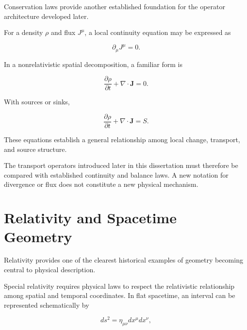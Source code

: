 \documentclass[12pt,oneside]{book}
\begin{document}
Conservation laws provide another established foundation for
the operator architecture developed later.

For a density \(\rho\) and flux \(J^\mu\), a local continuity
equation may be expressed as

\begin{equation}
    \partial_\mu J^\mu
    =
    0.
    \label{eq:four-current-conservation}
\end{equation}

In a nonrelativistic spatial decomposition, a familiar form is

\begin{equation}
    \frac{\partial \rho}{\partial t}
    +
    \nabla\cdot\mathbf{J}
    =
    0.
    \label{eq:continuity-equation}
\end{equation}

With sources or sinks,

\begin{equation}
    \frac{\partial \rho}{\partial t}
    +
    \nabla\cdot\mathbf{J}
    =
    S.
    \label{eq:continuity-with-source}
\end{equation}

These equations establish a general relationship among local
change, transport, and source structure.

The transport operators introduced later in this dissertation
must therefore be compared with established continuity and
balance laws. A new notation for divergence or flux does not
constitute a new physical mechanism.


\section{Relativity and Spacetime Geometry}
\label{sec:relativity-history}

Relativity provides one of the clearest historical examples of
geometry becoming central to physical description.

Special relativity requires physical laws to respect the
relativistic relationship among spatial and temporal
coordinates. In flat spacetime, an interval can be represented
schematically by

\begin{equation}
    ds^2
    =
    \eta_{\mu\nu}
    dx^\mu dx^\nu,
    \label{eq:minkowski-interval}
\end{equation}
\end{document}
